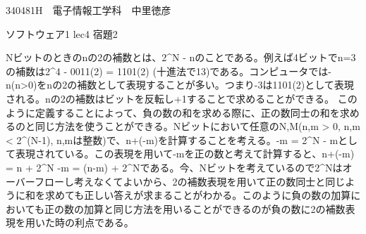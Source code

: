 340481H　電子情報工学科　中里徳彦

ソフトウェア1 lec4 宿題2

Nビットのときのnの2の補数とは、2^N - nのことである。例えば4ビットでn=3の補数は2^4 - 0011(2) = 1101(2) (十進法で13)である。コンピュータでは-n(n>0)をnの2の補数として表現することが多い。つまり-3は1101(2)として表現される。nの2の補数はビットを反転し+1することで求めることができる。
このように定義することによって、負の数の和を求める際に、正の数同士の和を求めるのと同じ方法を使うことができる。Nビットにおいて任意のN,M(n,m > 0, n,m < 2^(N-1), n,mは整数)で、n+(-m)を計算することを考える。-m = 2^N - mとして表現されている。この表現を用いて-mを正の数と考えて計算すると、n+(-m) = n + 2^N -m = (n-m) + 2^Nである。今、Nビットを考えているので2^Nはオーバーフローし考えなくてよいから、2の補数表現を用いて正の数同士と同じように和を求めても正しい答えが求まることがわかる。このように負の数の加算においても正の数の加算と同じ方法を用いることができるのが負の数に2の補数表現を用いた時の利点である。
